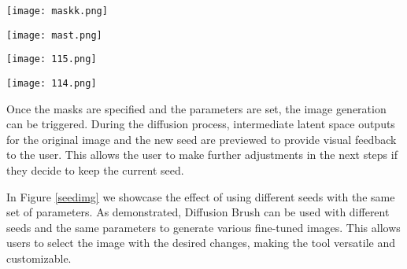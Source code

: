 \documentclass[10pt,twocolumn,letterpaper]{article}
\begin{document}
\begin{figure*}[!ht]
  \centering
  \begin{minipage}[b]{0.24\textwidth}
        \texttt{[image: maskk.png]}
  \end{minipage}
    \begin{minipage}[b]{0.24\textwidth}
        \texttt{[image: mast.png]}
  \end{minipage}
    \begin{minipage}[b]{0.24\textwidth}
        \texttt{[image: 115.png]}
  \end{minipage}
    \begin{minipage}[b]{0.24\textwidth}
        \texttt{[image: 114.png]}
  \end{minipage}

\caption{Effect of using different seed numbers with the same set of parameters (i,e, the mask, $n$, and $\alpha$).}
  \label{seedimg}
\end{figure*}

Once the masks are specified and the parameters are set, the image generation can be triggered. During the diffusion process, intermediate latent space outputs for the original image and the new seed are previewed to provide visual feedback to the user. This allows the user to make further adjustments in the next steps if they decide to keep the current seed.

In Figure \ref{seedimg} we showcase the effect of using different seeds with the same set of parameters. As demonstrated, Diffusion Brush can be used with different seeds and the same parameters to generate various fine-tuned images. This allows users to select the image with the desired changes, making the tool versatile and customizable.

\end{document}
